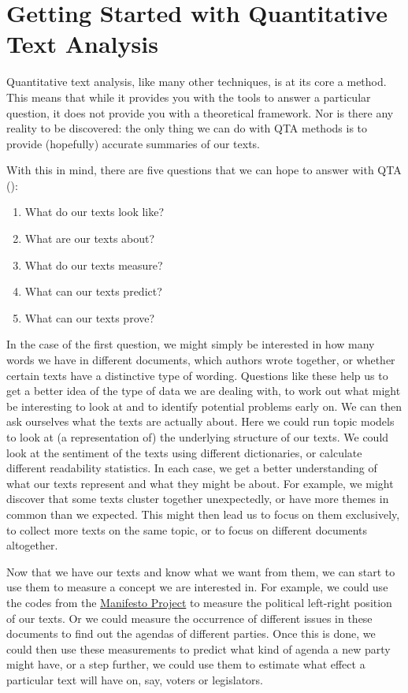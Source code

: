 \documentclass[
]{book}
\providecommand{\tightlist}{%
  \setlength{\itemsep}{0pt}\setlength{\parskip}{0pt}}
\begin{document}
\chapter{Getting Started with Quantitative Text Analysis}\label{getting-started-with-qta}

Quantitative text analysis, like many other techniques, is at its core a method. This means that while it provides you with the tools to answer a particular question, it does not provide you with a theoretical framework. Nor is there any reality to be discovered: the only thing we can do with QTA methods is to provide (hopefully) accurate summaries of our texts.

With this in mind, there are five questions that we can hope to answer with QTA ():

\begin{enumerate}
\def\labelenumi{\arabic{enumi}.}
\tightlist
\item
  What do our texts look like?
\item
  What are our texts about?
\item
  What do our texts measure?
\item
  What can our texts predict?
\item
  What can our texts prove?
\end{enumerate}

In the case of the first question, we might simply be interested in how many words we have in different documents, which authors wrote together, or whether certain texts have a distinctive type of wording. Questions like these help us to get a better idea of the type of data we are dealing with, to work out what might be interesting to look at and to identify potential problems early on. We can then ask ourselves what the texts are actually about. Here we could run topic models to look at (a representation of) the underlying structure of our texts. We could look at the sentiment of the texts using different dictionaries, or calculate different readability statistics. In each case, we get a better understanding of what our texts represent and what they might be about. For example, we might discover that some texts cluster together unexpectedly, or have more themes in common than we expected. This might then lead us to focus on them exclusively, to collect more texts on the same topic, or to focus on different documents altogether.

Now that we have our texts and know what we want from them, we can start to use them to measure a concept we are interested in. For example, we could use the codes from the \href{https://manifesto-project.wzb.eu/}{Manifesto Project} to measure the political left-right position of our texts. Or we could measure the occurrence of different issues in these documents to find out the agendas of different parties. Once this is done, we could then use these measurements to predict what kind of agenda a new party might have, or a step further, we could use them to estimate what effect a particular text will have on, say, voters or legislators.
\end{document}

